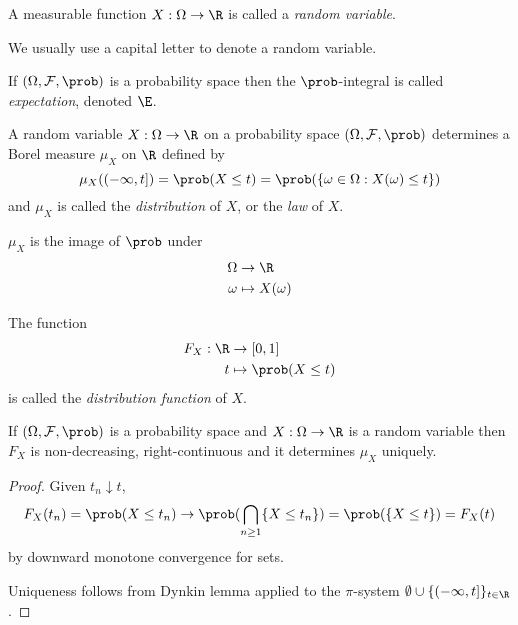 \documentclass[a4paper]{article}
\renewcommand{\P}{\prob} %
\begin{document}
\begin{definition}
  A measurable function \(X: \Omega \to \R\) is called a \emph{random variable}.
\end{definition}

We usually use a capital letter to denote a random variable.

\begin{definition}[expectation]
  If \((\Omega, \mathcal F, \P)\) is a probability space then the \(\P\)-integral is called \emph{expectation}, denoted \(\E\).
\end{definition}

\begin{definition}
  A random variable \(X: \Omega \to \R\) on a probability space \((\Omega, \mathcal F, \P)\) determines a Borel measure \(\mu_X\) on \(\R\) defined by
  \[
    \mu_X((-\infty, t]) = \P(X \leq t) = \P(\{\omega \in \Omega: X(\omega) \leq t\})
  \]
  and \(\mu_X\) is called the \emph{distribution} of \(X\), or the \emph{law} of \(X\).
\end{definition}

\begin{note}
  \(\mu_X\) is the image of \(\P\) under
  \begin{align*}
    \Omega &\to \R \\
    \omega &\mapsto X(\omega)
  \end{align*}
\end{note}

\begin{definition}
  The function
  \begin{align*}
    F_X: \R &\to [0, 1] \\
    t &\mapsto \P(X \leq t)
  \end{align*}
  is called the \emph{distribution function} of \(X\).
\end{definition}

\begin{proposition}\leavevmode
  If \((\Omega, \mathcal F, \P)\) is a probability space and \(X: \Omega \to \R\) is a random variable then \(F_X\) is non-decreasing, right-continuous and it determines \(\mu_X\) uniquely.
\end{proposition}

\begin{proof}
  Given \(t_n \downarrow t\),
  \[
    F_X(t_n) = \P(X \leq t_n) \to \P(\bigcap_{n \geq 1} \{X \leq t_n\}) = \P(\{X \leq t\}) = F_X(t)
  \]
  by downward monotone convergence for sets.
  
  Uniqueness follows from Dynkin lemma applied to the \(\pi\)-system \(\emptyset \cup \{(-\infty, t]\}_{t \in \R}\).
\end{proof}
\end{document}
